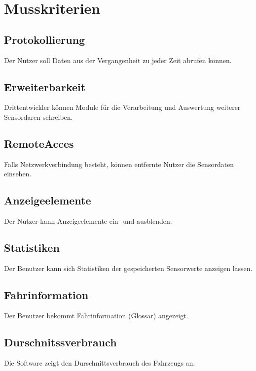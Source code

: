 \documentclass[pflichtenheft.tex]{subfiles}
\begin{document}
\section{Musskriterien}



\subsection{\mknr Protokollierung} Der Nutzer soll Daten aus der Vergangenheit zu jeder Zeit abrufen können.


\subsection{\mknr Erweiterbarkeit} Drittentwickler können Module für die Verarbeitung und Auswertung weiterer Sensordaren schreiben.


\subsection{\mknr RemoteAcces} Falls Netzwerkverbindung besteht, können entfernte Nutzer die Sensordaten einsehen.

\subsection{\mknr Anzeigeelemente} Der Nutzer kann Anzeigeelemente ein- und ausblenden.

\subsection{\mknr Statistiken} Der Benutzer kann sich Statistiken der gespeicherten Sensorwerte anzeigen lassen.


\subsection{\mknr Fahrinformation} Der Benutzer bekommt Fahrinformation (Glossar) angezeigt.

\subsection{\mknr Durschnitssverbrauch} Die Software zeigt den Durschnittsverbrauch des Fahrzeugs an. 
\end{document}
